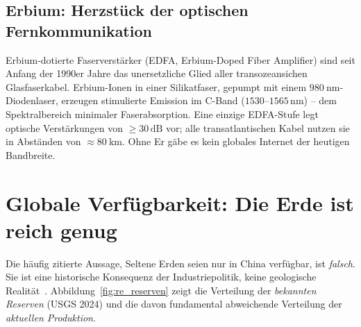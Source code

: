 ﻿\documentclass[12pt, a4paper]{report}
\theoremstyle{definition}
\theoremstyle{remark}
\begin{document}
\subsection{Erbium: Herzstück der optischen Fern\-kommunikation}

Erbium-dotierte Faserverstärker (EDFA, Erbium-Doped Fiber Amplifier) sind
seit Anfang der 1990er Jahre das unersetzliche Glied aller transozeansichen
Glasfaserkabel. Erbium-Ionen in einer Silikatfaser, gepumpt mit einem
$\SI{980}{\nano\metre}$-Diodenlaser, erzeugen stimulierte Emission im
C-Band ($1530$--$1565\,\text{nm}$) -- dem Spektralbereich minimaler
Faserabsorption. Eine einzige EDFA-Stufe legt optische Verstärkungen von
$\geq 30\,\text{dB}$ vor; alle transatlantischen Kabel nutzen sie in
Abständen von $\approx \SI{80}{\kilo\metre}$. Ohne Er gäbe es kein globales
Internet der heutigen Bandbreite.

\section{Globale Verfügbarkeit: Die Erde ist reich genug}
\label{ssec:re_global}

Die häufig zitierte Aussage, Seltene Erden seien nur in China verfügbar, ist
\emph{falsch}. Sie ist eine historische Konsequenz der Industriepolitik, keine
geologische Realität~\cite{alonso2012}. Abbildung~\ref{fig:re_reserven} zeigt
die Verteilung der \emph{bekannten Reserven} (USGS 2024) und die davon
fundamental abweichende Verteilung der \emph{aktuellen Produktion}.
\end{document}
